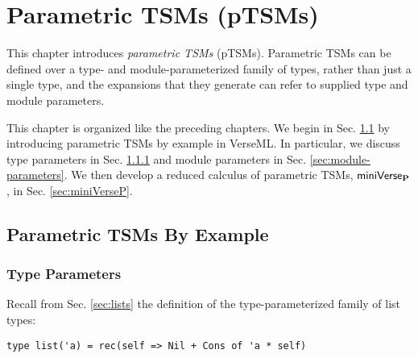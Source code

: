 
\chapter{Parametric TSMs (pTSMs)}\label{chap:ptsms}
This chapter introduces \emph{parametric TSMs} (pTSMs). Parametric TSMs can be defined over a type- and module-parameterized family of types, rather than just a single type, and the expansions that they generate can refer to  supplied type and module parameters. 

This chapter is organized like the preceding chapters. We begin in Sec. \ref{sec:parameterized-tsms-by-example} by introducing parametric TSMs by example in VerseML. In particular, we discuss type parameters in Sec. \ref{sec:type-parameters} and module parameters in Sec. \ref{sec:module-parameters}. We then develop a reduced calculus of parametric TSMs, $\mathsf{miniVerse}_\textbf{P}$, in Sec. \ref{sec:miniVerseP}.

\section{Parametric TSMs By Example}\label{sec:parameterized-tsms-by-example}

\subsection{Type Parameters}\label{sec:type-parameters}
Recall from Sec. \ref{sec:lists} the definition of the type-parameterized family of list types:
\begin{lstlisting}[numbers=none]
type list('a) = rec(self => Nil + Cons of 'a * self)
\end{lstlisting}


